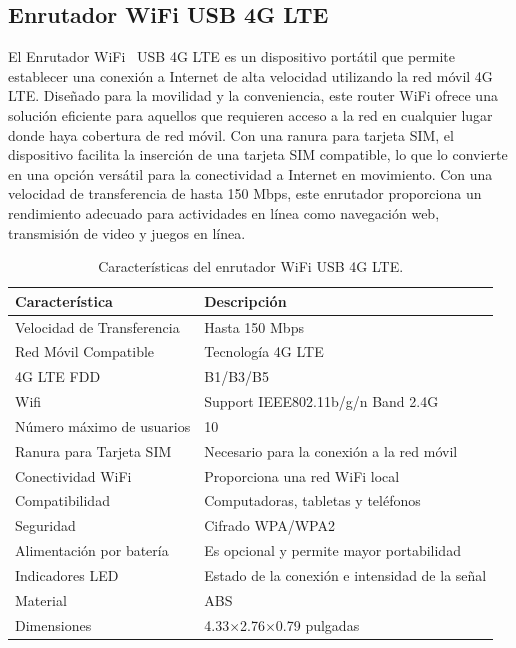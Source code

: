 \subsection{Enrutador WiFi USB 4G LTE}
El Enrutador WiFi~\cite{misc:EnrutadorWifi} USB 4G LTE es un dispositivo portátil que permite establecer una conexión a Internet de alta velocidad utilizando la red móvil 4G LTE. Diseñado para la movilidad y la conveniencia, este router WiFi ofrece una solución eficiente para aquellos que requieren acceso a la red en cualquier lugar donde haya cobertura de red móvil. Con una ranura para tarjeta SIM, el dispositivo facilita la inserción de una tarjeta SIM compatible, lo que lo convierte en una opción versátil para la conectividad a Internet en movimiento. Con una velocidad de transferencia de hasta 150 Mbps, este enrutador proporciona un rendimiento adecuado para actividades en línea como navegación web, transmisión de video y juegos en línea.

\begin{table}[htbp]
\begin{center}
\caption{Características del enrutador WiFi USB 4G LTE.}
\begin{tabular}{|l|l|}
\hline
\rowcolor[HTML]{C0C0C0} 
\textbf{Característica} & \textbf{Descripción}\\ \hline
Velocidad de Transferencia &  Hasta 150 Mbps\\ \hline
Red Móvil Compatible &  Tecnología 4G LTE \\ \hline
4G LTE FDD & B1/B3/B5 \\ \hline
Wifi & Support IEEE802.11b/g/n Band 2.4G \\ \hline
Número máximo de usuarios & 10 \\ \hline
Ranura para Tarjeta SIM &  Necesario para la conexión a la red móvil \\ \hline
Conectividad WiFi & Proporciona una red WiFi local\\ \hline
Compatibilidad & Computadoras, tabletas y teléfonos \\ \hline
Seguridad & Cifrado WPA/WPA2 \\ \hline
Alimentación por batería & Es opcional y permite mayor portabilidad \\ \hline
Indicadores LED & Estado de la conexión e intensidad de la señal \\ \hline
Material & ABS \\ \hline
Dimensiones & 4.33$\times$2.76$\times$0.79 pulgadas\\ \hline
\end{tabular}
\end{center}
\end{table}


